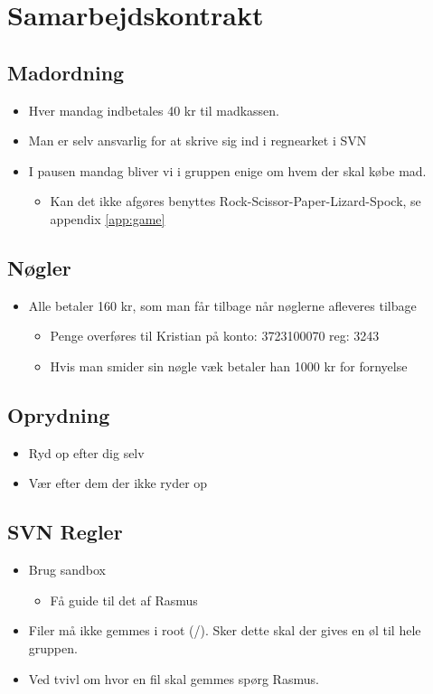 \documentclass{article}
\begin{document}
\section{Samarbejdskontrakt}
\subsection{Madordning}
\begin{itemize}
	\item Hver mandag indbetales 40 kr til madkassen.
	\item Man er selv ansvarlig for at skrive sig ind i regnearket i SVN
	\item I pausen mandag bliver vi i gruppen enige om hvem der skal k\o{}be mad.
	\begin{itemize}
		\item Kan det ikke afg\o{}res benyttes Rock-Scissor-Paper-Lizard-Spock, se appendix \ref{app:game}
	\end{itemize}
\end{itemize}

\subsection{N\o{}gler}
\begin{itemize}
	\item Alle betaler 160 kr, som man f\aa{}r tilbage n\aa{}r n\o{}glerne afleveres tilbage
	\begin{itemize}
		\item Penge overf\o{}res til Kristian på konto: 3723100070 reg: 3243
		\item Hvis man smider sin n\o{}gle v\ae{}k betaler han 1000 kr for fornyelse
	\end{itemize}
\end{itemize}

\subsection{Oprydning}
\begin{itemize}
	\item Ryd op efter dig selv
	\item V\ae{}r efter dem der ikke ryder op
\end{itemize}

\subsection{SVN Regler}
\begin{itemize}
	\item Brug sandbox
	\begin{itemize}
		\item F\aa{} guide til det af Rasmus
	\end{itemize}
	\item Filer m\aa{} ikke gemmes i root (/). Sker dette skal der gives en \o{}l til hele gruppen.
	\item Ved tvivl om hvor en fil skal gemmes sp\o{}rg Rasmus.
\end{itemize}
\end{document}
